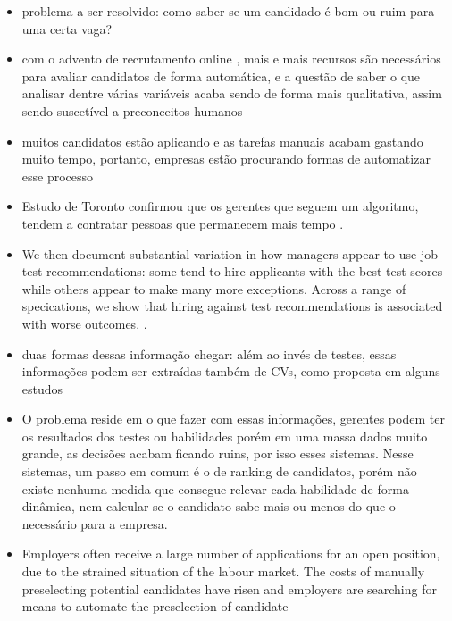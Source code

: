 \documentclass[preprint,12pt]{elsarticle}
\begin{document}
\begin{itemize}
\item problema a ser resolvido: como saber se um candidado é bom ou ruim para uma certa vaga?
\item com o advento de recrutamento online \cite{automatic-profiling-2008}, mais e mais recursos são necessários para avaliar candidatos de forma automática, e a questão de saber o que analisar dentre várias variáveis acaba sendo de forma mais qualitativa, assim sendo suscetível a preconceitos humanos
\item muitos candidatos estão aplicando e as tarefas manuais acabam gastando muito tempo, portanto, empresas estão procurando formas de automatizar esse processo 
\item Estudo de Toronto confirmou que os gerentes que seguem um algoritmo, tendem a contratar pessoas que permanecem mais tempo \cite{NBERw21709}.
\item We then document substantial variation in
how managers appear to use job test recommendations: some tend to hire applicants with the best test scores while others appear to make many more exceptions. Across a range of specications, we show that hiring against test recommendations is associated with worse outcomes. \cite{NBERw21709}.
\item duas formas dessas informação chegar: além ao invés de testes, essas informações podem ser extraídas também de CVs, como proposta em alguns estudos \cite{automatic-profiling-2008, e-gen-job-processing-2007}

\item O problema reside em o que fazer com essas informações, gerentes podem ter os resultados dos testes ou habilidades porém em uma massa dados muito grande, as decisões acabam ficando ruins, por isso esses sistemas. Nesse sistemas, um passo em comum é o de ranking de candidatos, porém não existe nenhuma medida que consegue relevar cada habilidade de forma dinâmica, nem calcular se o candidato sabe mais ou menos do que o necessário para a empresa.


\item Employers often receive a large number of applications for an open position, due to the strained situation of the labour market. The costs of manually preselecting potential candidates have risen and employers are searching for means to automate the preselection of candidate \cite{impact-semantic-web-2005}


\end{itemize}
\end{document}
